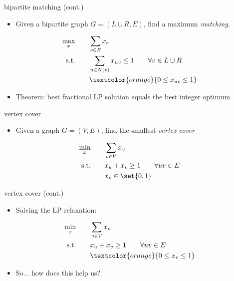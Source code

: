 \documentclass[aspectratio=169, handout]{beamer}
\begin{document}
\begin{frame}{bipartite matching (cont.)}
    \begin{itemize}
        \item Given a bipartite graph $G = (L \cup R, E)$, find a maximum \emph{matching}.
    \end{itemize}

    \begin{align*}
        \max_{x} \qquad    & \sum_{e \in E} x_e                                           \\
        \text{s.t.} \qquad & \sum_{u \in N(v)} x_{uv} \le 1 \qquad \forall v \in L \cup R \\
                           & \textcolor{orange}{0 \le x_{uv} \le 1}
    \end{align*}

    \pause

    \begin{itemize}
        \item Theorem: best fractional LP solution equals the best integer optimum
    \end{itemize}
\end{frame}

\begin{frame}{vertex cover}
    \begin{itemize}
        \item Given a graph $G = (V, E)$, find the smallest \emph{vertex cover}
    \end{itemize}

    \pause

    \begin{align*}
        \min_{x} \qquad    & \sum_{v \in V} x_v                      \\
        \text{s.t.} \qquad & x_u + x_v \ge 1 \qquad \forall uv \in E \\
                           & x_v \in \set{0, 1}
    \end{align*}
\end{frame}

\begin{frame}{vertex cover (cont.)}
    \begin{itemize}
        \item Solving the LP relaxation:
    \end{itemize}

    \begin{align*}
        \min_{x} \qquad    & \sum_{v \in V} x_v                      \\
        \text{s.t.} \qquad & x_u + x_v \ge 1 \qquad \forall uv \in E \\
                           & \textcolor{orange}{0 \le x_v \le 1}
    \end{align*}

    \pause

    \begin{itemize}
        \item So... how does this help us?
    \end{itemize}
\end{frame}
\end{document}
